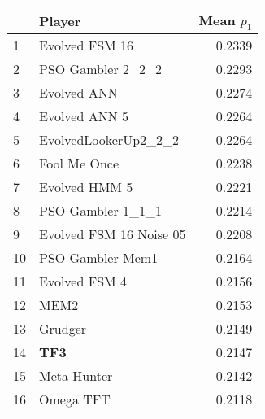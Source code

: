 \begin{tabular}{llr}
\toprule
{} &                   Player &  Mean $p_1$ \\
\midrule
1  &           Evolved FSM 16 &      0.2339 \\
2  &        PSO Gambler 2\_2\_2 &      0.2293 \\
3  &              Evolved ANN &      0.2274 \\
4  &            Evolved ANN 5 &      0.2264 \\
5  &     EvolvedLookerUp2\_2\_2 &      0.2264 \\
6  &             Fool Me Once &      0.2238 \\
7  &            Evolved HMM 5 &      0.2221 \\
8  &        PSO Gambler 1\_1\_1 &      0.2214 \\
9  &  Evolved FSM 16 Noise 05 &      0.2208 \\
10 &         PSO Gambler Mem1 &      0.2164 \\
11 &            Evolved FSM 4 &      0.2156 \\
12 &                     MEM2 &      0.2153 \\
13 &                  Grudger &      0.2149 \\
14 &                      \textbf{TF3} &      0.2147 \\
15 &              Meta Hunter &      0.2142 \\
16 &                Omega TFT &      0.2118 \\
\bottomrule
\end{tabular}
